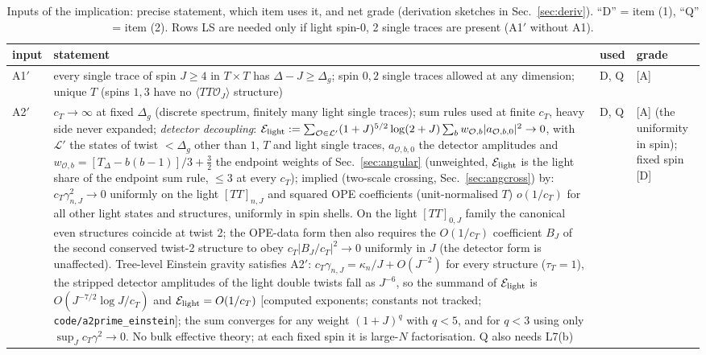 \documentclass[aps,prl,onecolumn,superscriptaddress,nofootinbib]{revtex4-2}
\begin{document}
\begin{table}[!htbp]
\caption{\label{tab:inputs}Inputs of the implication: precise statement, which item uses it, and
net grade (derivation sketches in Sec.~\ref{sec:deriv}). ``D'' = item (1), ``Q'' = item (2). Rows LS
are needed only if light spin-0, 2 single traces are present (A1$'$ without A1).}
\scriptsize
\begin{ruledtabular}
\begin{tabular}{L{1.5cm}L{9.6cm}L{0.8cm}L{4.3cm}}
input & statement & used & grade\\\hline
A1$'$ & every single trace of spin $J\ge4$ in $T\times T$ has $\Delta-J\ge\Delta_g$; spin $0,2$ single traces allowed at any dimension; unique $T$ (spins $1,3$ have no $\langle TT\mathcal O_J\rangle$ structure) & D, Q & [A]\\
A2$'$ & $c_T\to\infty$ at fixed $\Delta_g$ (discrete spectrum, finitely many light single traces); sum rules used at finite $c_T$, heavy side never expanded; \emph{detector decoupling}: $\mathcal E_{\rm light}:=\sum_{\mathcal O\in\mathcal L'}(1+J)^{5/2}\log(2+J)\sum_b w_{\mathcal O,b}|a_{\mathcal O,b,0}|^2\to0$, with $\mathcal L'$ the states of twist $<\Delta_g$ other than $1$, $T$ and light single traces, $a_{\mathcal O,b,0}$ the detector amplitudes and $w_{\mathcal O,b}=[T_\Delta-b(b-1)]/3+\tfrac32$ the endpoint weights of Sec.~\ref{sec:angular} (unweighted, $\mathcal E_{\rm light}$ is the light share of the endpoint sum rule, $\le3$ at every $c_T$); implied (two-scale crossing, Sec.~\ref{sec:angcross}) by: $c_T\gamma_{n,J}^2\to0$ uniformly on the light $[TT]_{n,J}$ and squared OPE coefficients (unit-normalised $T$) $o(1/c_T)$ for all other light states and structures, uniformly in spin shells. On the light $[TT]_{0,J}$ family the canonical even structures coincide at twist 2; the OPE-data form then also requires the $O(1/c_T)$ coefficient $B_J$ of the second conserved twist-2 structure to obey $c_T|B_J/c_T|^2\to0$ uniformly in $J$ (the detector form is unaffected). Tree-level Einstein gravity satisfies A2$'$: $c_T\gamma_{n,J}=\kappa_n/J+O(J^{-2})$ for every structure ($\tau_T=1$), the stripped detector amplitudes of the light double twists fall as $J^{-6}$, so the summand of $\mathcal E_{\rm light}$ is $O(J^{-7/2}\log J/c_T)$ and $\mathcal E_{\rm light}=O(1/c_T)$ [computed exponents; constants not tracked; \texttt{code/a2prime\_einstein}]; the sum converges for any weight $(1+J)^q$ with $q<5$, and for $q<3$ using only $\sup_Jc_T\gamma^2\to0$. No bulk effective theory; at each fixed spin it is large-$N$ factorisation. Q also needs L7(b) & D, Q & [A] (the uniformity in spin); fixed spin [D]\\

\end{tabular}
\end{ruledtabular}
\end{table}
\end{document}
